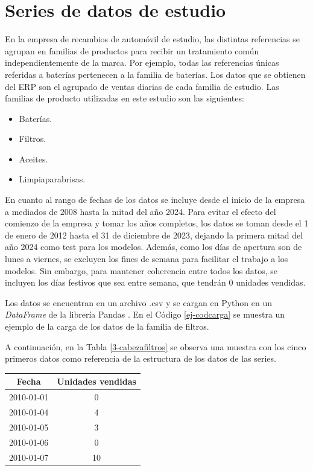 \section{Series de datos de estudio}

En la empresa de recambios de automóvil de estudio, las distintas referencias se agrupan en familias de productos para recibir un tratamiento común independientemente de la marca. Por ejemplo, todas las referencias únicas referidas a baterías pertenecen a la familia de baterías. Los datos que se obtienen del ERP son el agrupado de ventas diarias de cada familia de estudio. Las familias de producto utilizadas en este estudio son las siguientes:

\begin{itemize}
    \item Baterías.
    \item Filtros.
    \item Aceites.
    \item Limpiaparabrisas.
\end{itemize} 

En cuanto al rango de fechas de los datos se incluye desde el inicio de la empresa a mediados de 2008 hasta la mitad del año 2024. Para evitar el efecto del comienzo de la empresa y tomar los años completos, los datos se toman desde el 1 de enero de 2012 hasta el 31 de diciembre de 2023, dejando la primera mitad del año 2024 como test para los modelos. Además, como los días de apertura son de lunes a viernes, se excluyen los fines de semana para facilitar el trabajo a los modelos. Sin embargo, para mantener coherencia entre todos los datos, se incluyen los días festivos que sea entre semana, que tendrán 0 unidades vendidas.

Los datos se encuentran en un archivo .csv y se cargan en Python en un \textit{DataFrame} de la librería Pandas \cite{pandas}. En el Código \ref*{ej-codcarga} se muestra un ejemplo de la carga de los datos de la familia de filtros. 



A continuación, en la Tabla \ref*{3-cabezafiltros} se observa una muestra con los cinco primeros datos como referencia de la estructura de los datos de las series.

\begin{table}[H]
	{\begin{tabular}{|c|c|}
		\hline
        \textbf{Fecha} & \textbf{Unidades vendidas} \\
        \hline
        2010-01-01 & 0 \\
        \hline
        2010-01-04 & 4 \\
        \hline
        2010-01-05 & 3 \\
        \hline
        2010-01-06 & 0 \\
        \hline
        2010-01-07 & 10 \\
        \hline
	\end{tabular}}
\end{table}


